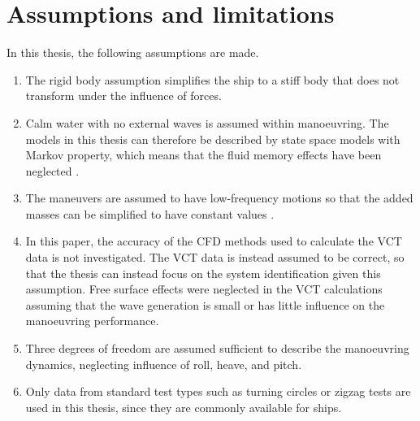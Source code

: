 \section{Assumptions and limitations}
In this thesis, the following assumptions are made.
\begin{enumerate}[label=(\Roman*),itemsep=1mm]
    \item The rigid body assumption simplifies the ship to a stiff body that does not transform under the influence of forces.

    \item Calm water with no external waves is assumed within manoeuvring. The models in this thesis can therefore be described by state space models with Markov property, which means that the fluid memory effects have been neglected \cite{fossenHandbookMarineCraft2011}. 

    \item The maneuvers are assumed to have low-frequency motions so that the added masses can be simplified to have constant values \cite{fossenHandbookMarineCraft2011}.
    
    \item In this paper, the accuracy of the CFD methods used to calculate the VCT data is not investigated. The VCT data is instead assumed to be correct, so that the thesis can instead focus on the system identification given this assumption. Free surface effects were neglected in the VCT calculations assuming that the wave generation is small or has little influence on the manoeuvring performance.

    \item Three degrees of freedom are assumed sufficient to describe the manoeuvring dynamics, neglecting influence of roll, heave, and pitch. 

    \item Only data from standard test types such as turning circles or zigzag tests are used in this thesis, since they are commonly available for ships. 
        
\end{enumerate}



